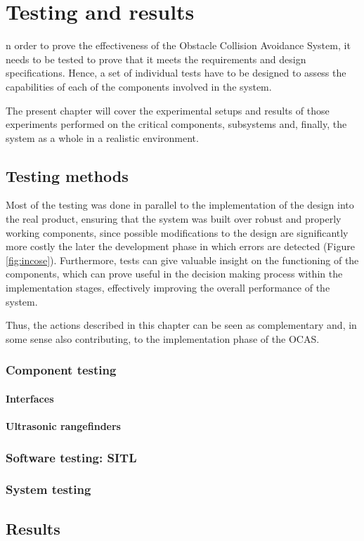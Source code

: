
\let\textcircled=\pgftextcircled
\chapter{Testing and results} \label{chapter:testing}

n order to prove the effectiveness of the Obstacle Collision Avoidance System, it needs to be tested to prove that it meets the requirements and design specifications.
Hence, a set of individual tests have to be designed to assess the capabilities of each of the components involved in the system.

The present chapter will cover the experimental setups and results of those experiments performed on the critical components, subsystems and, finally, the system as a whole in a realistic environment.


\section{Testing methods}

Most of the testing was done in parallel to the implementation of the design into the real product, ensuring that the system was built over robust and properly working components, since possible modifications to the design are significantly more costly the later the development phase in which errors are detected (Figure \ref{fig:incose}).
Furthermore, tests can give valuable insight on the functioning of the components, which can prove useful in the decision making process within the implementation stages, effectively improving the overall performance of the system.

Thus, the actions described in this chapter can be seen as complementary and, in some sense also contributing, to the implementation phase of the OCAS.

\subsection{Component testing}

\subsubsection{Interfaces}

\subsubsection{Ultrasonic rangefinders}


\subsection{Software testing: SITL}


\subsection{System testing}


\section{Results}


